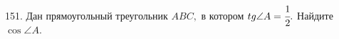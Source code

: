 151. Дан прямоугольный треугольник $ABC,$ в котором $tg\angle A=\cfrac{1}{2}.$ Найдите $\cos \angle A.$\\
